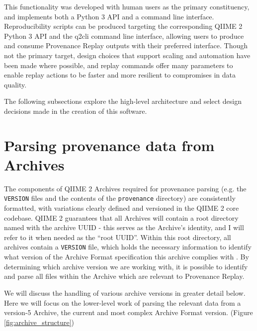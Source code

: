 This functionality was developed with human users as the primary constituency,
and implements both a Python 3 API and a command line interface. Reproducibility
scripts can be produced targeting the corresponding QIIME 2 Python 3 API and the
q2cli command line interface, allowing users to produce and consume Provenance
Replay outputs with their preferred interface. Though not the primary target,
design choices that support scaling and automation have been made where
possible, and replay commands offer many parameters to enable replay actions to
be faster and more resilient to compromises in data quality.

The following subsections explore the high-level architecture and select design
decisions made in the creation of this software.

\section{Parsing provenance data from Archives}

The components of QIIME 2 Archives required for provenance parsing (e.g. the
\texttt{VERSION} files and the contents of the \texttt{provenance} directory) are consistently
formatted, with variations clearly defined and versioned in the QIIME 2 core
codebase. QIIME 2 guarantees that all Archives will contain a root directory
named with the archive UUID - this serves as the Archive’s identity, and I will
refer to it when needed as the “root UUID”. Within this root directory, all
archives contain a \texttt{VERSION} file, which holds the necessary information to
identify what version of the Archive Format specification this archive complies
with \parencite{qiime_2_development_team_anatomy_2018}. By determining which
archive version we are working with, it is possible to identify and parse all
files within the Archive which are relevant to Provenance Replay.

We will discuss the handling of various archive versions in greater detail
below. Here we will focus on the lower-level work of parsing the relevant data
from a version-5 Archive, the current and most complex Archive Format version.
(Figure \ref{fig:archive_structure})

